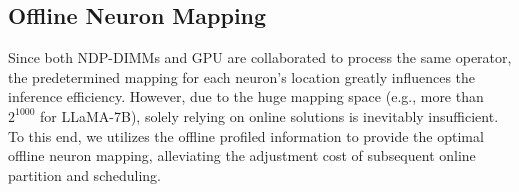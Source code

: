 


\subsection{Offline Neuron Mapping} \label{sec:offline}
Since both NDP-DIMMs and GPU are collaborated to process the same operator, the predetermined mapping for each neuron's location greatly influences the inference efficiency. However, due to the huge mapping space (e.g., more than $2^{1000}$ for LLaMA-7B), solely relying on online solutions is inevitably insufficient. To this end, we utilizes the offline profiled information to provide the optimal offline neuron mapping, alleviating the adjustment cost of subsequent online partition and scheduling.


